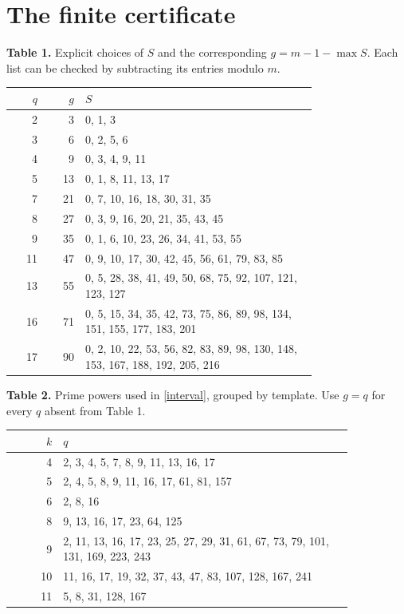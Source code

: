 \documentclass[11pt]{article}
\begin{document}
\newpage
\section{The finite certificate}
\textbf{Table 1.} Explicit choices of $S$ and the corresponding $g=m-1-\max S$. Each list can be checked by subtracting its entries modulo $m$.\\[3pt]
{\small\begin{tabular}{r r p{0.76\linewidth}}
$q$ & $g$ & $S$\\ \hline
2 & 3 & 0, 1, 3 \\
3 & 6 & 0, 2, 5, 6 \\
4 & 9 & 0, 3, 4, 9, 11 \\
5 & 13 & 0, 1, 8, 11, 13, 17 \\
7 & 21 & 0, 7, 10, 16, 18, 30, 31, 35 \\
8 & 27 & 0, 3, 9, 16, 20, 21, 35, 43, 45 \\
9 & 35 & 0, 1, 6, 10, 23, 26, 34, 41, 53, 55 \\
11 & 47 & 0, 9, 10, 17, 30, 42, 45, 56, 61, 79, 83, 85 \\
13 & 55 & 0, 5, 28, 38, 41, 49, 50, 68, 75, 92, 107, 121, 123, 127 \\
16 & 71 & 0, 5, 15, 34, 35, 42, 73, 75, 86, 89, 98, 134, 151, 155, 177, 183, 201 \\
17 & 90 & 0, 2, 10, 22, 53, 56, 82, 83, 89, 98, 130, 148, 153, 167, 188, 192, 205, 216 \\
\end{tabular}}

\textbf{Table 2.} Prime powers used in \eqref{interval}, grouped by template. Use $g=q$ for every $q$ absent from Table 1.\\[3pt]
{\small\begin{tabular}{r p{0.85\linewidth}}
$k$ & $q$\\ \hline
4 & 2, 3, 4, 5, 7, 8, 9, 11, 13, 16, 17 \\
5 & 2, 4, 5, 8, 9, 11, 16, 17, 61, 81, 157 \\
6 & 2, 8, 16 \\
8 & 9, 13, 16, 17, 23, 64, 125 \\
9 & 2, 11, 13, 16, 17, 23, 25, 27, 29, 31, 61, 67, 73, 79, 101, 131, 169, 223, 243 \\
10 & 11, 16, 17, 19, 32, 37, 43, 47, 83, 107, 128, 167, 241 \\
11 & 5, 8, 31, 128, 167 \\
\end{tabular}}
\end{document}
